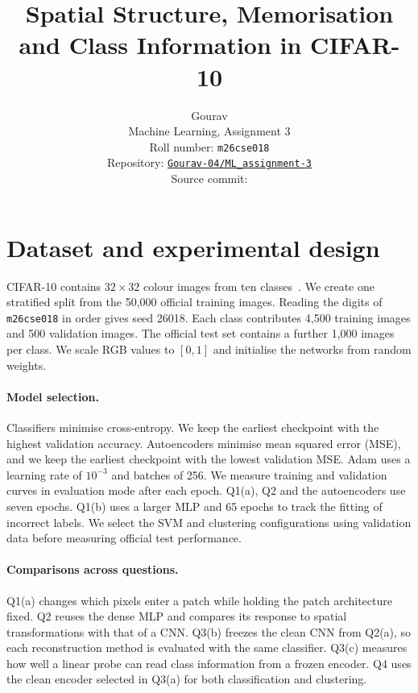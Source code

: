 \documentclass[10pt,twocolumn,letterpaper]{article}
\title{Spatial Structure, Memorisation and Class Information in CIFAR-10}
\author{Gourav\\
Machine Learning, Assignment 3\\
Roll number: \texttt{m26cse018}\\
{\small Repository:
\href{https://github.com/Gourav-04/ML_assignment-3}
     {\texttt{Gourav-04/ML\_assignment-3}}}\\
{\small Source commit: \ReportSourceLink}}
\begin{document}
\maketitle
\raggedbottom

\begin{abstract}
\AbstractFindings{}
\end{abstract}

\section{Dataset and experimental design}

CIFAR-10 contains $32\times32$ colour images from ten
classes~\cite{krizhevsky2009}. We create one stratified split from the
50,000 official training images. Reading the digits of
\texttt{m26cse018} in order gives seed 26018. Each class contributes
4,500 training images and 500 validation images. The official test set
contains a further 1,000 images per class. We scale RGB values to
$[0,1]$ and initialise the networks from random weights.

\paragraph{Model selection.}
Classifiers minimise cross-entropy. We keep the earliest checkpoint
with the highest validation accuracy. Autoencoders minimise mean
squared error (MSE), and we keep the earliest checkpoint with the
lowest validation MSE. Adam uses a learning rate of $10^{-3}$ and
batches of 256. We measure training and validation curves in evaluation
mode after each epoch. Q1(a), Q2 and the autoencoders use seven epochs.
Q1(b) uses a larger MLP and 65 epochs to track the fitting of
incorrect labels. We select the SVM and clustering configurations
using validation data before measuring official test performance.

\paragraph{Comparisons across questions.}
Q1(a) changes which pixels enter a patch while holding the patch
architecture fixed. Q2 reuses the dense MLP and compares its response
to spatial transformations with that of a CNN. Q3(b) freezes the clean
CNN from Q2(a), so each reconstruction method is evaluated with the
same classifier. Q3(c) measures how well a linear probe can read class
information from a frozen encoder. Q4 uses the clean encoder selected
in Q3(a) for both classification and clustering.
\end{document}
